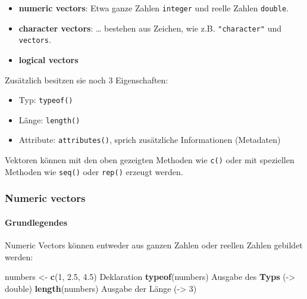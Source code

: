 \documentclass[
]{article}
\newenvironment{Shaded}{\begin{snugshade}}{\end{snugshade}}
\newcommand{\DecValTok}[1]{\textcolor[rgb]{0.00,0.00,0.81}{#1}}
\newcommand{\FloatTok}[1]{\textcolor[rgb]{0.00,0.00,0.81}{#1}}
\newcommand{\FunctionTok}[1]{\textcolor[rgb]{0.13,0.29,0.53}{\textbf{#1}}}
\newcommand{\NormalTok}[1]{#1}
\newcommand{\OtherTok}[1]{\textcolor[rgb]{0.56,0.35,0.01}{#1}}
\providecommand{\tightlist}{%
  \setlength{\itemsep}{0pt}\setlength{\parskip}{0pt}}
\begin{document}
\begin{itemize}
\tightlist
\item
  \textbf{numeric vectors}: Etwa ganze Zahlen \texttt{integer} und
  reelle Zahlen \texttt{double}.
\item
  \textbf{character vectors}: \ldots{} bestehen aus Zeichen, wie z.B.
  \texttt{"character"} und
  \texttt{\textquotesingle{}vectors\textquotesingle{}}.
\item
  \textbf{logical vectors}
\end{itemize}

Zusätzlich besitzen sie noch 3 Eigenschaften:

\begin{itemize}
\tightlist
\item
  Typ: \texttt{typeof()}
\item
  Länge: \texttt{length()}
\item
  Attribute: \texttt{attributes()}, sprich zusätzliche Informationen
  (Metadaten)
\end{itemize}

Vektoren können mit den oben gezeigten Methoden wie \texttt{c()} oder
mit speziellen Methoden wie \texttt{seq()} oder \texttt{rep()} erzeugt
werden.

\hypertarget{numeric-vectors}{%
\subsubsection{Numeric vectors}\label{numeric-vectors}}

\hypertarget{grundlegendes}{%
\paragraph{Grundlegendes}\label{grundlegendes}}

Numeric Vectors können entweder aus ganzen Zahlen oder reellen Zahlen
gebildet werden:

\begin{Shaded}
\begin{Highlighting}[]
\NormalTok{numbers }\OtherTok{\textless{}{-}} \FunctionTok{c}\NormalTok{(}\DecValTok{1}\NormalTok{, }\FloatTok{2.5}\NormalTok{, }\FloatTok{4.5}\NormalTok{)     Deklaration}
\FunctionTok{typeof}\NormalTok{(numbers)               Ausgabe des }\FunctionTok{Typs}\NormalTok{ (}\OtherTok{{-}\textgreater{}}\NormalTok{ double)}
\FunctionTok{length}\NormalTok{(numbers)               Ausgabe der Länge (}\OtherTok{{-}\textgreater{}} \DecValTok{3}\NormalTok{)}
\end{Highlighting}
\end{Shaded}
\end{document}
